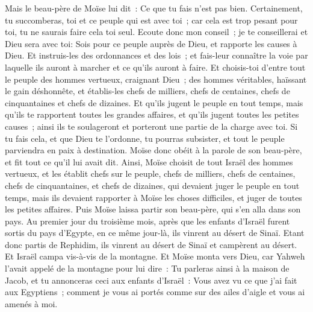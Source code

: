 \begin{multicols}{2}
Mais le beau-père de Moïse lui dit~: Ce que tu fais n'est pas bien.
Certainement, tu succomberas, toi et ce peuple qui est avec toi~; car cela est trop pesant pour toi, tu ne saurais faire cela toi seul.
Ecoute donc mon conseil~; je te conseillerai et Dieu sera avec toi: Sois pour ce peuple auprès de Dieu, et rapporte les causes à Dieu.
Et instruis-les des ordonnances et des lois~; et fais-leur connaître la voie par laquelle ils auront à marcher et ce qu'ils auront à faire.
Et choisis-toi d'entre tout le peuple des hommes vertueux, craignant Dieu~; des hommes véritables, haïssant le gain déshonnête, et établis-les chefs de milliers, chefs de centaines, chefs de cinquantaines et chefs de dizaines.
Et qu'ils jugent le peuple en tout temps, mais qu'ils te rapportent toutes les grandes affaires, et qu'ils jugent toutes les petites causes~; ainsi ils te soulageront et porteront une partie de la charge avec toi.
Si tu fais cela, et que Dieu te l'ordonne, tu pourras subsister, et tout le peuple parviendra en paix à destination.
Moïse donc obéit à la parole de son beau-père, et fit tout ce qu'il lui avait dit.
Ainsi, Moïse choisit de tout Israël des hommes vertueux, et les établit chefs sur le peuple, chefs de milliers, chefs de centaines, chefs de cinquantaines, et chefs de dizaines,
qui devaient juger le peuple en tout temps, mais ils devaient rapporter à Moïse les choses difficiles, et juger de toutes les petites affaires.
Puis Moïse laissa partir son beau-père, qui s'en alla dans son pays.
\VerseOne{}Au premier jour du troisième mois, après que les enfants d'Israël furent sortis du pays d'Egypte, en ce même jour-là, ils vinrent au désert de Sinaï.
Etant donc partis de Rephidim, ils vinrent au désert de Sinaï et campèrent au désert. Et Israël campa vis-à-vis de la montagne.
Et Moïse monta vers Dieu, car Yahweh l'avait appelé de la montagne pour lui dire~: Tu parleras ainsi à la maison de Jacob, et tu annonceras ceci aux enfants d'Israël~:
Vous avez vu ce que j'ai fait aux Egyptiens~; comment je vous ai portés comme sur des ailes d'aigle et vous ai amenés à moi.

\end{multicols}
